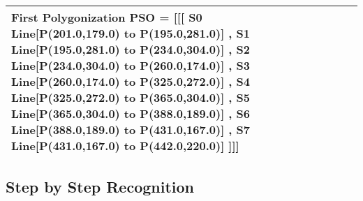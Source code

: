 \begin{landscape}
\begin{scriptsize}
\begin{longtable}{|p{2cm}|p{2cm}|p{2cm}|p{2cm}|p{13cm}|}
 First Polygonization PSO = [[[  S0 Line[P(201.0,179.0) to P(195.0,281.0)]  ,      S1 Line[P(195.0,281.0) to P(234.0,304.0)]  ,      S2 Line[P(234.0,304.0) to P(260.0,174.0)]  ,      S3 Line[P(260.0,174.0) to P(325.0,272.0)]  ,      S4 Line[P(325.0,272.0) to P(365.0,304.0)]  ,      S5 Line[P(365.0,304.0) to P(388.0,189.0)]  ,      S6 Line[P(388.0,189.0) to P(431.0,167.0)]  ,      S7 Line[P(431.0,167.0) to P(442.0,220.0)]  ]]]  
 \\ \hline 
 
 
 
		\end{longtable}


\end{scriptsize}

\end{landscape}
\subsection{Step by Step Recognition}
\label{sec:steprec}
	
	
	
%	
%	
%  
%
